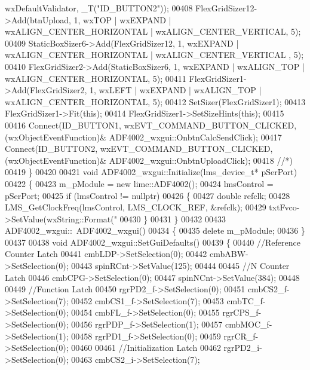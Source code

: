 \begin{DoxyCode}
      wxDefaultValidator, \_T(\textcolor{stringliteral}{"ID\_BUTTON2"}));
00408     FlexGridSizer12->Add(btnUpload, 1, wxTOP | wxEXPAND | wxALIGN\_CENTER\_HORIZONTAL | 
      wxALIGN\_CENTER\_VERTICAL, 5);
00409     StaticBoxSizer6->Add(FlexGridSizer12, 1, wxEXPAND | wxALIGN\_CENTER\_HORIZONTAL | wxALIGN\_CENTER\_VERTICAL
      , 5);
00410     FlexGridSizer2->Add(StaticBoxSizer6, 1, wxEXPAND | wxALIGN\_TOP | wxALIGN\_CENTER\_HORIZONTAL, 5);
00411     FlexGridSizer1->Add(FlexGridSizer2, 1, wxLEFT | wxEXPAND | wxALIGN\_TOP | wxALIGN\_CENTER\_HORIZONTAL, 5);
00412     SetSizer(FlexGridSizer1);
00413     FlexGridSizer1->Fit(\textcolor{keyword}{this});
00414     FlexGridSizer1->SetSizeHints(\textcolor{keyword}{this});
00415 
00416     Connect(ID\_BUTTON1, wxEVT\_COMMAND\_BUTTON\_CLICKED, (wxObjectEventFunction)&
      ADF4002_wxgui::OnbtnCalcSendClick);
00417     Connect(ID\_BUTTON2, wxEVT\_COMMAND\_BUTTON\_CLICKED, (wxObjectEventFunction)&
      ADF4002_wxgui::OnbtnUploadClick);
00418     \textcolor{comment}{//*)}
00419 \}
00420 
00421 \textcolor{keywordtype}{void} ADF4002_wxgui::Initialize(lms_device_t* pSerPort)
00422 \{
00423     m\_pModule = \textcolor{keyword}{new} lime::ADF4002();
00424     lmsControl = pSerPort;
00425     \textcolor{keywordflow}{if} (lmsControl != \textcolor{keyword}{nullptr})
00426     \{
00427         \textcolor{keywordtype}{double} refclk;
00428         LMS_GetClockFreq(lmsControl, LMS_CLOCK_REF, &refclk);
00429         txtFvco->SetValue(wxString::Format(\textcolor{stringliteral}{"%
00430     \}
00431 \}
00432 
00433 ADF4002_wxgui::~ADF4002_wxgui()
00434 \{
00435     \textcolor{keyword}{delete} m\_pModule;
00436 \}
00437 
00438 \textcolor{keywordtype}{void} ADF4002_wxgui::SetGuiDefaults()
00439 \{
00440     \textcolor{comment}{//Reference Counter Latch}
00441     cmbLDP->SetSelection(0);
00442     cmbABW->SetSelection(0);
00443     spinRCnt->SetValue(125);
00444 
00445     \textcolor{comment}{//N Counter Latch}
00446     cmbCPG->SetSelection(0);
00447     spinNCnt->SetValue(384);
00448 
00449     \textcolor{comment}{//Function Latch}
00450     rgrPD2\_f->SetSelection(0);
00451     cmbCS2\_f->SetSelection(7);
00452     cmbCS1\_f->SetSelection(7);
00453     cmbTC\_f->SetSelection(0);
00454     cmbFL\_f->SetSelection(0);
00455     rgrCPS\_f->SetSelection(0);
00456     rgrPDP\_f->SetSelection(1);
00457     cmbMOC\_f->SetSelection(1);
00458     rgrPD1\_f->SetSelection(0);
00459     rgrCR\_f->SetSelection(0);
00460 
00461     \textcolor{comment}{//Initialization Latch}
00462     rgrPD2\_i->SetSelection(0);
00463     cmbCS2\_i->SetSelection(7);
}
\end{DoxyCode}
